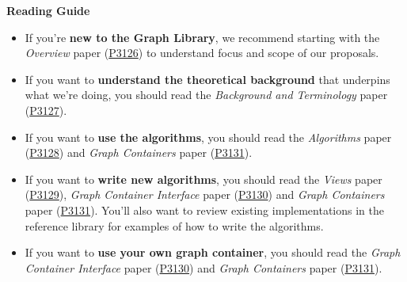 \textbf{Reading Guide} 
\begin{itemize}
  \item If you're \textbf{new to the Graph Library}, we recommend starting with the \textit{Overview} paper (\href{https://www.wg21.link/P3126}{P3126}) to understand focus and scope of our proposals.
  \item If you want to \textbf{understand the theoretical background} that underpins what we're doing, you should read the \textit{Background and Terminology} paper (\href{https://www.wg21.link/P3127}{P3127}).
  \item If you want to \textbf{use the algorithms}, you should read the \textit{Algorithms} paper (\href{https://www.wg21.link/P3128}{P3128}) and \textit{Graph Containers} paper (\href{https://www.wg21.link/P3131}{P3131}).
  \item If you want to \textbf{write new algorithms}, you should read the \textit{Views} paper (\href{https://www.wg21.link/P3129}{P3129}), \textit{Graph Container Interface} paper (\href{https://www.wg21.link/P3130}{P3130}) and \textit{Graph Containers} paper (\href{https://www.wg21.link/P3131}{P3131}).
        You'll also want to review existing implementations in the reference library for examples of how to write the algorithms.
  \item If you want to \textbf{use your own graph container}, you should read the \textit{Graph Container Interface} paper (\href{https://www.wg21.link/P3130}{P3130}) and \textit{Graph Containers} paper (\href{https://www.wg21.link/P3131}{P3131}).
\end{itemize}

  
%
